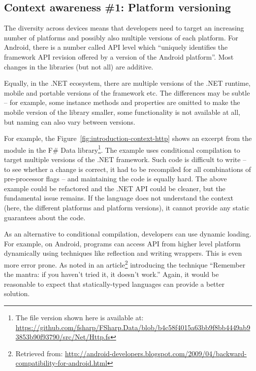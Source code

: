 \subsection{Context awareness \#1: Platform versioning}

The diversity across devices means that developers need to target an increasing number of platforms
and possibly also multiple versions of each platform. For Android, there is a number called
API level \cite{app-android-apilevel} which ``uniquely identifies the framework API revision offered
by a version of the Android platform''. Most changes in the libraries (but not all) are additive.

Equally, in the .NET ecosystem, there are multiple versions of the .NET runtime, mobile and
portable versions of the framework etc. The differences may be subtle -- for example, some instance
methods and properties are omitted to make the mobile version of the library smaller, some functionality
is not available at all, but naming can also vary between versions.

For example, the Figure~\ref{fig:introduction-context-http} shows an excerpt from the  module
in the F\# Data library\footnote{The file version shown here is available at:
\url{https://github.com/fsharp/FSharp.Data/blob/b4c58f4015a63bb9f8bb4449ab93853b90f93790/src/Net/Http.fs}}.
The example uses conditional compilation to target multiple versions of the .NET framework. Such code
is difficult to write -- to see whether a change is correct, it had to be recompiled for all combinations
of pre-processor flags -- and maintaining the code is equally hard. The above example could be refactored
and the .NET API could be cleaner, but the fundamental issue remains. If the language does not understand
the context (here, the different platforms and platform versions), it cannot provide any static
guarantees about the code.

As an alternative to conditional compilation, developers can use dynamic loading. For example,
on Android, programs can access API from higher level platform dynamically using techniques like
reflection and writing wrappers. This is even more error prone. As noted in an article\footnote{Retrieved
from: \url{http://android-developers.blogspot.com/2009/04/backward-}\\\url{compatibility-for-android.html}}
introducing the technique ``Remember the mantra: if you haven't tried it, it doesn't work.''
Again, it would be reasonable to expect that statically-typed languages can provide a better solution.

